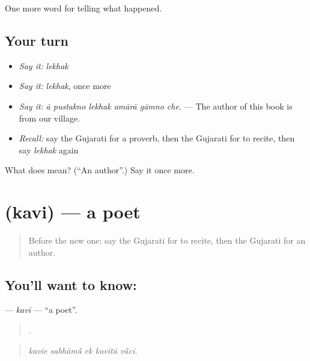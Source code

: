 \begin{grammarlens}[title={What you've built}]
One more word for telling what happened.
\end{grammarlens}

\subsection*{Your turn}
\begin{itemize}
\raggedright
  \item \emph{Say it:} \emph{lekhak}
  \item \emph{Say it:} \emph{lekhak}, once more
  \item \emph{Say it:} \emph{ā pustakno lekhak amārā gāmno che.} — The author of this book is from our village.
  \item \emph{Recall:} say the Gujarati for a proverb, then the Gujarati for to recite, then say \emph{lekhak} again
\end{itemize}

\begin{tcolorbox}[breakable,colback=teal!4,colframe=teal!35!black,title={Before you move on}]
What does  mean? (\textquotedblleft{}An author\textquotedblright{}.) Say it once more.
\end{tcolorbox}
\section[\texorpdfstring{\gu{કવિ} (kavi)}{કવિ (kavi)}]{ (kavi) — a poet}

\label{lesson:GU-C336-kavi}



\begin{quote}
Before the new one: say the Gujarati for to recite, then the Gujarati for an author.
\end{quote}

\subsection*{You'll want to know: }
\textbf{} — \emph{kavi} — \textquotedblleft{}a poet\textquotedblright{}.

\begin{quote}
    .
\end{quote}

\begin{quote}
\emph{kavie sabhāmā̃ ek kavitā vā̃cī.}
\end{quote}

